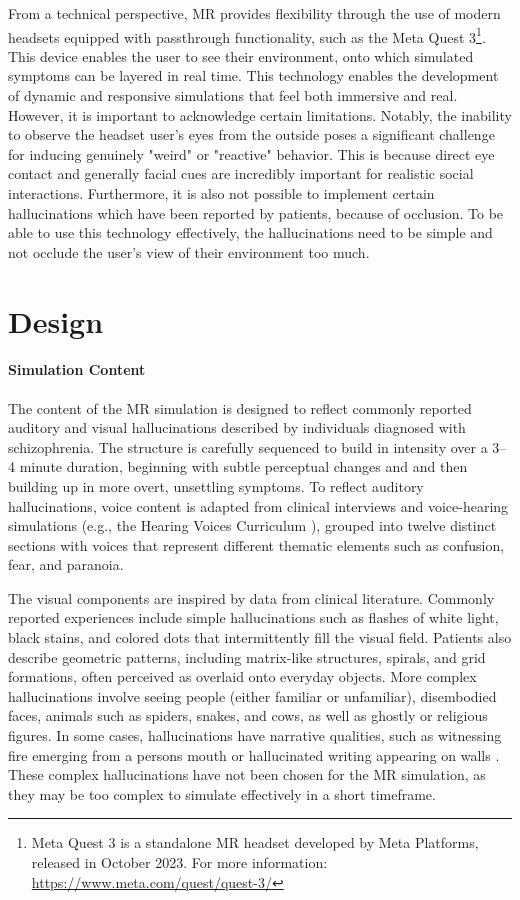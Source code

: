 From a technical perspective, MR provides flexibility through the use of modern headsets equipped with passthrough functionality, such as the Meta Quest 3\footnote{Meta Quest 3 is a standalone MR headset developed by Meta Platforms, released in October 2023. For more information: \url{https://www.meta.com/quest/quest-3/}}. This device enables the user to see their environment, onto which simulated symptoms can be layered in real time. This technology enables the development of dynamic and responsive simulations that feel both immersive and real. However, it is important to acknowledge certain limitations. Notably, the inability to observe the headset user's eyes from the outside poses a significant challenge for inducing genuinely "weird" or "reactive" behavior. This is because direct eye contact and generally facial cues are incredibly important for realistic social interactions. Furthermore, it is also not possible to implement certain hallucinations which have been reported by patients, because of occlusion. To be able to use this technology effectively, the hallucinations need to be simple and not occlude the user's view of their environment too much. 

\section{Design}

\paragraph{Simulation Content} The content of the MR simulation is designed to reflect commonly reported auditory and visual hallucinations described by individuals diagnosed with schizophrenia. The structure is carefully sequenced to build in intensity over a 3--4 minute duration, beginning with subtle perceptual changes and and then building up in more overt, unsettling symptoms. To reflect auditory hallucinations, voice content is adapted from clinical interviews and voice-hearing simulations (e.g., the Hearing Voices Curriculum \cite{Chaffin2013}), grouped into twelve distinct sections with voices that represent different thematic elements such as confusion, fear, and paranoia.

\vspace{1em}

The visual components are inspired by data from clinical literature. Commonly reported experiences include simple hallucinations such as flashes of white light, black stains, and colored dots that intermittently fill the visual field. Patients also describe geometric patterns, including matrix-like structures, spirals, and grid formations, often perceived as overlaid onto everyday objects. More complex hallucinations involve seeing people (either familiar or unfamiliar), disembodied faces, animals such as spiders, snakes, and cows, as well as ghostly or religious figures. In some cases, hallucinations have narrative qualities, such as witnessing fire emerging from a persons mouth or hallucinated writing appearing on walls \cite{Vanommen2019,Silverstein2021}. These complex hallucinations have not been chosen for the MR simulation, as they may be too complex to simulate effectively in a short timeframe.

